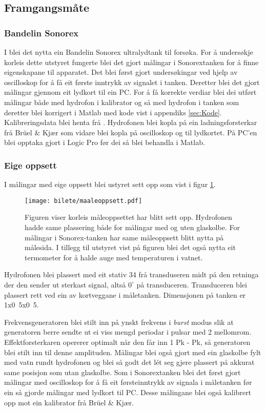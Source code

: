 \subsection{Framgangsmåte}
\subsubsection*{Bandelin Sonorex}
I \cite{ultraprotese} blei det nytta ein Bandelin Sonorex ultralydtank til forsøka. For å undersøkje korleis dette utstyret fungerte blei det gjort målingar i Sonorextanken for å finne eigenskapane til apparatet. Det blei først gjort undersøkingar ved hjelp av oscilloskop for å få eit første inntrykk av signalet i tanken. Deretter blei det gjort målingar gjennom eit lydkort til ein PC. For å få korrekte verdiar blei dei utført målingar både med hydrofon i kalibrator og så med hydrofon i tanken som deretter blei korrigert i Matlab med kode vist i appendiks \ref{sec:Kode}. Kalibreringsdata blei henta frå \cite{calibrator}. Hydrofonen blei kopla på ein ladningsforsterkar frå Brüel \& Kjær som vidare blei kopla på oscilloskop og til lydkortet. På PC'en blei opptaka gjort i Logic Pro før dei så blei behandla i Matlab.

\subsubsection*{Eige oppsett}
I målingar med eige oppsett blei ustyret sett opp som vist i figur \ref{fig:maaleoppsett}.

\begin{figure}[htbp]
	\centering
  	\texttt{[image: bilete/maaleoppsett.pdf]}
  	\caption[Måleoppsett]{Figuren viser korleis måleoppsettet har blitt sett opp. Hydrofonen hadde same plassering både for målingar med og uten glaskolbe. For målingar i Sonorex-tanken har same måleoppsett blitt nytta på målesida. I tillegg til utstyret vist på figuren blei det også nytta eit termometer for å halde auge med temperaturen i vatnet.}
  	\label{fig:maaleoppsett}
\end{figure}

Hydrofonen blei plassert med eit stativ \unit{34}{\centi\metre} frå transduseren midt på den retninga der den sender ut sterkast signal, altså ${0}^\circ$ på transduceren. Transduceren blei plassert rett ved ein av kortveggane i måletanken. Dimensjonen på tanken er \unit{1x0.5x0.5}{\metre}.

Frekvensgeneratoren blei stilt inn på ynskt frekvens i \emph{burst} modus slik at generatoren berre sendte ut ei viss mengd periodar i pulsar med \unit{2}{\second} mellomrom. Effektforsterkaren opererer optimalt når den får inn \unit{1}{\volt} Pk - Pk, så generatoren blei stilt inn til denne amplituden. Målingar blei også gjort med ein glaskolbe fylt med vatn rundt hydrofonen og blei så godt det lét seg gjere plassert på akkurat same posisjon som utan glaskolbe. Som i Sonorextanken blei det først gjort målingar med oscilloskop for å få eit førsteinntrykk av signala i måletanken før ein så gjorde målingar med lydkort til PC. Desse målingane blei også kalibrert opp mot ein kalibrator frå Brüel \& Kjær.
